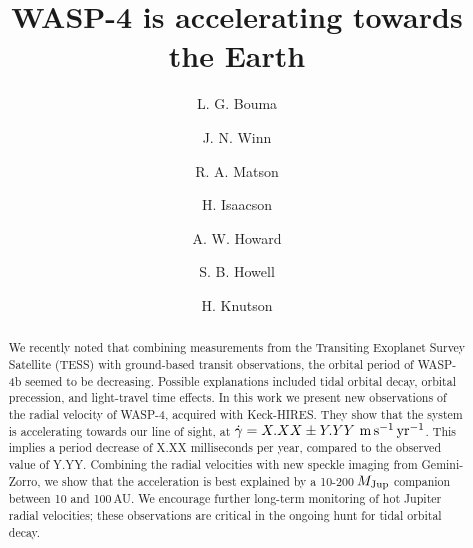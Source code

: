 \documentclass[12pt,twocolumn,tighten]{aastex62}
\begin{document}
\title{WASP-4 is accelerating towards the Earth}


%
%
\author[0000-0002-0514-5538]{L. G. Bouma}
%
\author[0000-0002-4265-047X]{J. N. Winn}
%
\author{R. A. Matson}
%

%
%
\author[0000-0002-0531-1073]{H. Isaacson}
%
\author[0000-0001-8638-0320]{A. W. Howard}
%
\author{S. B. Howell}
%
\author{H. Knutson}
%

\begin{abstract}
  We recently noted that combining measurements from the Transiting
  Exoplanet Survey Satellite (TESS) with ground-based transit
  observations, the orbital period of WASP-4b seemed to be decreasing.
  Possible explanations included tidal orbital decay, orbital
  precession, and light-travel time effects.
  In this work we present new observations of the radial velocity of
  WASP-4, acquired with Keck-HIRES.
  They show that the system is accelerating towards our line of sight,
  at $\dot{\gamma} = X.XX \pm Y.YY\ {\rm m}\,{\rm s}^{-1}\,{\rm
  yr}^{-1}$.
  This implies a period decrease of X.XX milliseconds per year,
  compared to the observed value of Y.YY.
  Combining the radial velocities with new speckle imaging from
  Gemini-Zorro, we show that the acceleration is best explained by a
  10-200$\,M_{\rm Jup}$ companion between 10 and 100$\,$AU.
  We encourage further long-term monitoring of hot Jupiter radial
  velocities; these observations are critical in the ongoing hunt
  for tidal orbital decay.
\end{abstract}

\end{document}
